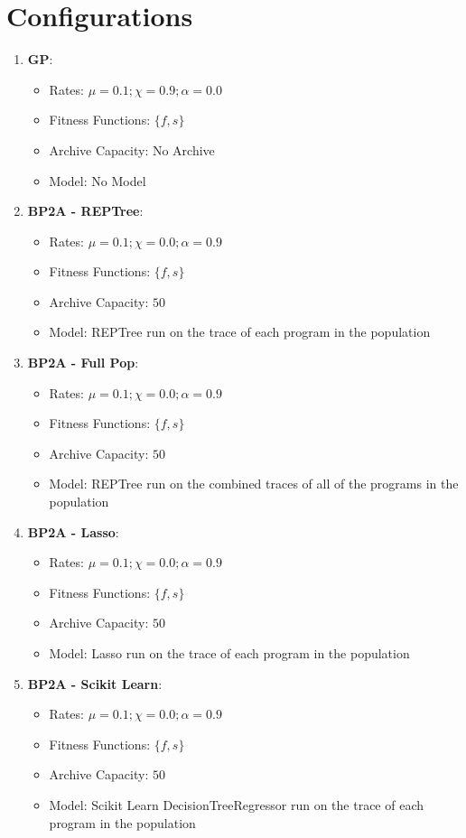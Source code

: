 \section{Configurations}
\begin{enumerate}

\item \textbf{GP}: 
\begin{itemize}[noitemsep]
\item Rates: $\mu = 0.1; \chi = 0.9; \alpha = 0.0$
\item Fitness Functions: $\{f, s\}$
\item Archive Capacity: No Archive
\item Model: No Model
\end{itemize}

\item \textbf{BP2A - REPTree}: 
\begin{itemize}[noitemsep]
\item Rates: $\mu = 0.1; \chi = 0.0; \alpha = 0.9$
\item Fitness Functions: $\{f, s\}$
\item Archive Capacity: $50$
\item Model: REPTree run on the trace of each program in the population
\end{itemize}

\item \textbf{BP2A - Full Pop}: 
\begin{itemize}[noitemsep]
\item Rates: $\mu = 0.1; \chi = 0.0; \alpha = 0.9$
\item Fitness Functions: $\{f, s\}$
\item Archive Capacity: $50$
\item Model: REPTree run on the combined traces of all of the programs in the population
\end{itemize}

\item \textbf{BP2A - Lasso}: 
\begin{itemize}[noitemsep]
\item Rates: $\mu = 0.1; \chi = 0.0; \alpha = 0.9$
\item Fitness Functions: $\{f, s\}$
\item Archive Capacity: $50$
\item Model: Lasso run on the trace of each program in the population
\end{itemize}

\item \textbf{BP2A - Scikit Learn}: 
\begin{itemize}[noitemsep]
\item Rates: $\mu = 0.1; \chi = 0.0; \alpha = 0.9$
\item Fitness Functions: $\{f, s\}$
\item Archive Capacity: $50$
\item Model: Scikit Learn DecisionTreeRegressor run on the trace of each program in the population
\end{itemize}


\end{enumerate}
